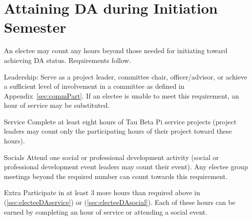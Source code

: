 \section{Attaining DA during Initiation Semester} An electee may count any hours beyond those needed for initiating toward achieving DA status. Requirements follow.
\begin{enumsubsection}
\item{Leadership:} Serve as a project leader, committee chair,  officer/advisor, or achieve a sufficient level of involvement in a committee as defined in Appendix~\ref{sec:commPart}. If an electee is unable to meet this requirement, an hour of service may be substituted.
\item{Service}\label{sec:electeeDAservice} Complete at least eight hours of Tau Beta Pi service projects (project leaders may count only the participating hours of their project toward these hours). 
\item{Socials} \label{sec:electeeDAsocial} Attend one social or professional development activity (social or professional development event leaders may count their event). Any electee group meetings beyond the required number can count towards this requirement.
\item{Extra} Participate in at least 3 more hours than required above in (\ref{sec:electeeDAservice}) or (\ref{sec:electeeDAsocial}). Each of these hours can be earned by completing an hour of service or attending a social event.

\end{enumsubsection}
